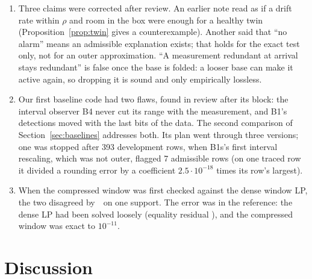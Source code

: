 \begin{enumerate}
  the first validation already showed it: the float32 build of the 16-number template detected 430098 (drift
  0.002\,\degC/s, rw) at 906, 240\,s after IM. The validation was then written to claim Theorem~\ref{thm:dom} for
  float64 only.
\item Three claims were corrected after review. An earlier note read as if a drift rate within $\rho$ and room in the
  box were enough for a healthy twin (Proposition~\ref{prop:twin} gives a counterexample). Another said that ``no
  alarm'' means an admissible explanation exists; that holds for the exact test only, not for an outer approximation.
  ``A measurement redundant at arrival stays redundant'' is false once the base is folded: a looser base can make it
  active again, so dropping it is sound and only empirically lossless.
\item Our first baseline code had two flaws, found in review after its block: the interval observer B4 never cut its
  range with the measurement, and B1's detections moved with the last bits of the data. The second comparison of
  Section~\ref{sec:baselines} addresses both. Its plan went through three versions; one was stopped after 393
  development rows, when B1s's first interval rescaling, which was not outer, flagged 7 admissible rows (on one
  traced row it divided a rounding error by a coefficient $2.5\cdot10^{-18}$ times its row's largest).
\item When the compressed window was first checked against the dense window LP, the two disagreed by
  \,\degC\ on one support. The error was in the reference: the dense LP had been solved loosely (equality
  residual ), and the compressed window was exact to $10^{-11}$.
\end{enumerate}

\section{Discussion}\label{sec:discussion}

